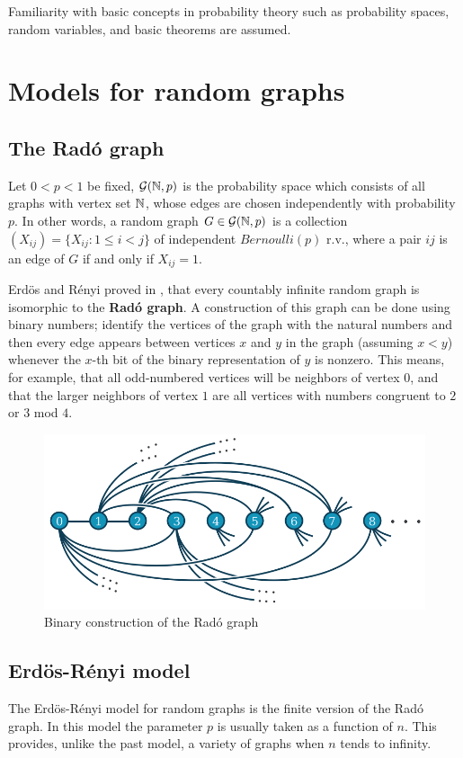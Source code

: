 Familiarity with basic concepts in probability theory such as probability spaces, random variables, and basic theorems are assumed.

\section{Models for random graphs}

\subsection{The Radó graph}
Let $0 < p < 1$ be fixed, $\mathcal{G}(\mathbb{N}, p)$ is the probability space which consists of all graphs with vertex set $\mathbb{N}$, whose edges are chosen independently with probability $p$. In other words, a random graph $G \in \mathcal{G}(\mathbb{N},p)$ is a collection $(X_{ij}) = \{ X_{ij} : 1 \leq i < j\}$ of independent $Bernoulli(p)$ r.v., where a pair $ij$ is an edge of $G$ if and only if $X_{ij} = 1$.

Erdös and Rényi proved in \cite[Erdös, Rényi 63]{RadoUnique}, that every countably infinite random graph is isomorphic to the \textbf{Radó graph}. A construction of this graph can be done using binary numbers; identify the vertices of the graph with the natural numbers and then every edge appears between vertices $x$ and $y$ in the graph (assuming $x < y$) whenever the $x$-th bit of the binary representation of $y$ is nonzero. This means, for example, that all odd-numbered vertices will be neighbors of vertex $0$, and that the larger neighbors of vertex $1$ are all vertices with numbers congruent to $2$ or $3$ mod $4$.

\begin{figure}[h!]
	\centering
	\includegraphics[scale=0.7]{Figures/Rado-graph.png}
	\caption{Binary construction of the Radó graph}
\end{figure}

\subsection{Erdös-Rényi model}
The Erdös-Rényi model for random graphs is the finite version of the Radó graph. In this model the parameter $p$ is usually taken as a function of $n$. This provides, unlike the past model, a variety of graphs when $n$ tends to infinity.

